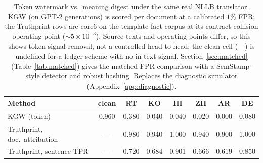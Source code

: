 \documentclass[11pt]{article}
\begin{document}
\begin{table}[t]
\centering
\caption{Token watermark vs.\ meaning digest under the same real NLLB
translator. KGW (on GPT-2 generations) is scored per document at a calibrated
$1\%$ FPR; the Truthprint rows are core6 on the template-fact corpus at its
contract-collision operating point ($\sim\!5\times10^{-3}$). Source texts and
operating points differ, so this shows token-signal removal, not a controlled
head-to-head; the clean cell (---) is undefined for a ledger scheme with no
in-text signal. Section~\ref{sec:matched} (Table~\ref{tab:matched}) gives the
matched-FPR comparison with a SemStamp-style detector and robust hashing. Replaces the diagnostic simulator (Appendix~\ref{app:diagnostic}).}
\label{tab:baselines}
\footnotesize
\begin{tabular}{lccccccc}
\toprule
Method & clean & RT & KO & HI & ZH & AR & DE \\
\midrule
KGW (token) & 0.960 & 0.380 & 0.040 & 0.040 & 0.020 & 0.000 & 0.080 \\
Truthprint, doc.\ attribution & --- & 0.980 & 0.940 & 1.000 & 0.940 & 0.900 & 1.000 \\
Truthprint, sentence TPR & --- & 0.720 & 0.684 & 0.901 & 0.666 & 0.619 & 0.850 \\
\bottomrule
\end{tabular}
\end{table}
\end{document}
